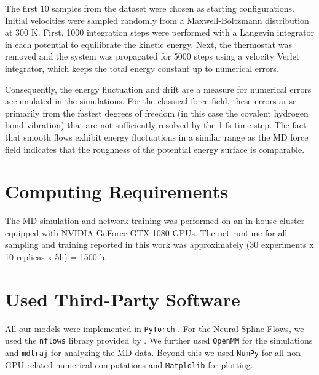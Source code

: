 \documentclass{article}
\begin{document}
The first 10 samples from the dataset were chosen as starting configurations. Initial velocities were sampled randomly from a Maxwell-Boltzmann distribution at 300 K. First,  1000 integration steps were performed with a Langevin integrator in each potential to equilibrate the kinetic energy. Next, the thermostat was removed and the system was propagated for 5000 steps using a velocity Verlet integrator, which keeps the total energy constant up to numerical errors. 

Consequently, the energy fluctuation and drift are a measure for numerical errors accumulated in the simulations. For the classical force field, these errors arise primarily from the fastest degrees of freedom (in this case the covalent hydrogen bond vibration) that are not sufficiently resolved by the 1 fs time step. The fact that smooth flows exhibit energy fluctuations in a similar range as the MD force field indicates that the roughness of the potential energy surface is comparable.

\section{Computing Requirements}
The MD simulation and network training was performed on an in-house cluster equipped with NVIDIA GeForce GTX 1080 GPUs. The net runtime for all sampling and training reported in this work was approximately (30 experiments x 10 replicas x 5h) = 1500 h.

\section{Used Third-Party Software}
All our models were implemented in \texttt{PyTorch} \cite{paszke2017automatic}. For the Neural Spline Flows, we used the \texttt{nflows} library provided by \citet{durkan2019neural}. We further used \texttt{OpenMM} \cite{eastman2017openmm} for the simulations and \texttt{mdtraj} \cite{mcgibbon2015mdtraj} for analyzing the MD data. Beyond this we used \texttt{NumPy}\cite{harris2020array} for all non-GPU related numerical computations and \texttt{Matplolib} \cite{Hunter:2007} for plotting.

% 
\end{document}
